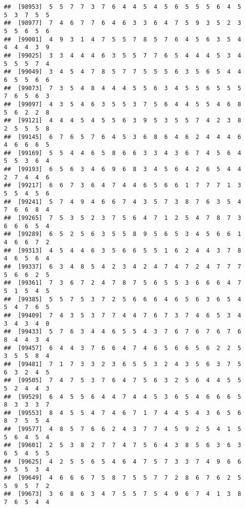 \documentclass[
]{book}
\begin{document}
\begin{verbatim}
##  [98953]  5  5  7  7  3  7  6  4  4  5  4  5  6  5  5  5  6  4  5  5  3  7  5  5
##  [98977]  7  4  6  7  7  6  4  6  3  3  6  4  7  5  9  3  5  2  3  5  5  6  5  6
##  [99001]  4  9  3  1  4  7  5  5  7  8  5  7  6  4  5  6  3  5  4  4  4  4  3  9
##  [99025]  3  3  4  4  4  6  3  5  5  7  7  6  5  4  4  4  5  3  4  5  5  5  7  4
##  [99049]  3  4  5  4  7  8  5  7  7  5  5  5  6  3  5  6  5  4  4  6  5  5  6  6
##  [99073]  7  3  5  4  8  4  4  4  5  5  6  3  4  5  5  6  5  5  5  7  6  5  6  3
##  [99097]  4  3  5  4  6  3  5  5  3  7  5  6  4  4  5  5  4  6  8  5  6  2  2  8
##  [99121]  4  4  4  5  4  5  5  6  3  9  5  3  5  5  7  4  2  3  8  2  5  5  5  8
##  [99145]  6  7  6  5  7  6  4  5  3  6  8  6  4  6  2  4  4  4  6  4  6  6  6  5
##  [99169]  5  5  4  4  6  5  8  6  6  3  3  4  3  6  7  4  5  6  4  5  5  3  6  4
##  [99193]  6  5  6  3  4  6  9  6  8  3  4  5  6  4  2  6  5  4  4  2  7  4  4  6
##  [99217]  6  6  7  3  6  4  7  4  4  6  5  6  6  1  7  7  7  1  3  5  5  4  5  6
##  [99241]  5  7  4  9  4  6  6  7  4  3  5  7  3  8  7  6  3  5  4  7  6  6  8  4
##  [99265]  7  5  3  5  2  3  7  5  6  4  7  1  2  5  4  7  8  7  3  6  6  6  5  4
##  [99289]  6  5  2  5  6  3  5  5  8  9  5  6  5  3  4  5  6  6  1  4  6  6  7  2
##  [99313]  4  5  4  4  6  3  5  6  6  5  5  1  6  2  4  4  3  7  8  4  6  5  6  4
##  [99337]  6  3  4  8  5  4  2  3  4  2  4  7  4  7  2  4  7  7  7  5  6  6  2  5
##  [99361]  7  3  6  7  2  4  7  8  7  5  6  5  5  3  6  6  6  4  7  5  1  5  4  5
##  [99385]  5  5  7  5  3  7  2  5  6  6  6  4  6  5  6  3  6  5  4  5  4  7  6  5
##  [99409]  7  4  3  5  3  7  7  4  4  7  6  7  3  7  4  6  5  3  4  3  4  3  4  0
##  [99433]  5  7  6  3  4  4  6  5  5  4  3  7  6  7  6  7  6  7  6  8  4  4  3  4
##  [99457]  6  4  4  3  7  6  6  4  7  4  6  5  6  6  5  6  2  2  5  3  5  5  8  4
##  [99481]  7  1  7  3  3  2  3  6  5  5  3  2  4  3  5  6  3  7  5  6  3  2  4  5
##  [99505]  7  4  7  5  3  7  6  4  7  5  6  3  2  5  6  4  4  5  5  5  2  4  4  3
##  [99529]  6  4  5  5  6  4  4  7  4  4  5  3  6  5  4  6  6  6  5  8  3  3  3  7
##  [99553]  8  4  5  5  4  7  4  6  7  1  7  4  4  5  4  3  6  5  6  8  7  5  5  4
##  [99577]  4  8  5  7  6  6  2  4  3  7  7  4  5  9  2  5  4  1  5  5  6  4  5  4
##  [99601]  2  5  3  8  2  7  7  4  7  5  6  4  3  8  5  6  3  6  3  6  5  4  5  5
##  [99625]  4  2  5  5  6  5  4  6  4  7  5  7  3  3  7  4  9  6  6  5  5  5  3  4
##  [99649]  4  6  6  6  7  5  8  7  5  5  7  7  2  8  6  7  6  2  5  5  9  5  7  2
##  [99673]  3  6  8  6  3  4  7  5  5  7  5  4  9  6  7  4  1  3  8  7  6  5  4  4

\end{verbatim}
\end{document}

